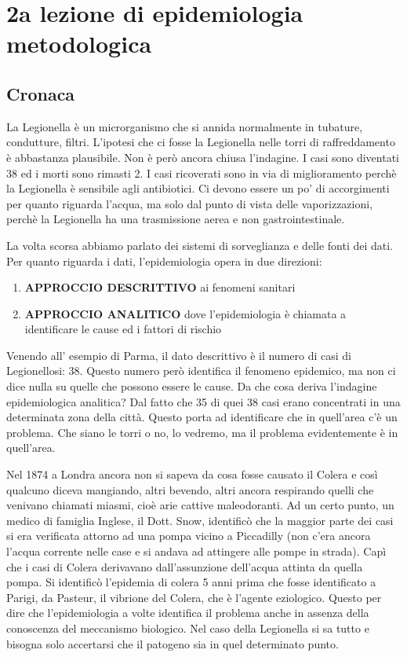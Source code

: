 
\section{2a lezione di epidemiologia metodologica}

\subsection{Cronaca}


La Legionella è un microrganismo che si annida normalmente in tubature,
condutture, filtri. L'ipotesi che ci fosse la Legionella nelle torri di
raffreddamento è abbastanza plausibile. Non è però ancora chiusa
l'indagine. I casi sono diventati 38 ed i morti sono rimasti 2. I casi
ricoverati sono in via di miglioramento perchè la Legionella è sensibile
agli antibiotici. Ci devono essere un po' di accorgimenti per quanto
riguarda l'acqua, ma solo dal punto di vista delle vaporizzazioni,
perchè la Legionella ha una trasmissione aerea e non gastrointestinale.

La volta scorsa abbiamo parlato dei sistemi di sorveglianza e delle
fonti dei dati. Per quanto riguarda i dati, l'epidemiologia opera in due
direzioni:

\begin{enumerate}
\def\labelenumi{\arabic{enumi}.}
\item
  \textbf{APPROCCIO DESCRITTIVO} ai fenomeni sanitari
\item
  \textbf{APPROCCIO ANALITICO} dove l'epidemiologia è chiamata a
  identificare le cause ed i fattori di rischio
\end{enumerate}

Venendo all' esempio di Parma, il dato descrittivo è il numero di casi
di Legionellosi: 38. Questo numero però identifica il fenomeno
epidemico, ma non ci dice nulla su quelle che possono essere le cause.
Da che cosa deriva l'indagine epidemiologica analitica? Dal fatto che 35
di quei 38 casi erano concentrati in una determinata zona della città.
Questo porta ad identificare che in quell'area c'è un problema. Che
siano le torri o no, lo vedremo, ma il problema evidentemente è in
quell'area.

Nel 1874 a Londra ancora non si sapeva da cosa fosse causato il Colera e
così qualcuno diceva mangiando, altri bevendo, altri ancora respirando
quelli che venivano chiamati miasmi, cioè arie cattive maleodoranti. Ad
un certo punto, un medico di famiglia Inglese, il Dott. Snow, identificò
che la maggior parte dei casi si era verificata attorno ad una pompa
vicino a Piccadilly (non c'era ancora l'acqua corrente nelle case e si
andava ad attingere alle pompe in strada). Capì che i casi di Colera
derivavano dall'assunzione dell'acqua attinta da quella pompa. Si
identificò l'epidemia di colera 5 anni prima che fosse identificato a
Parigi, da Pasteur, il vibrione del Colera, che è l'agente eziologico.
Questo per dire che l'epidemiologia a volte identifica il problema anche
in assenza della conoscenza del meccanismo biologico. Nel caso della
Legionella si sa tutto e bisogna solo accertarsi che il patogeno sia in
quel determinato punto.


